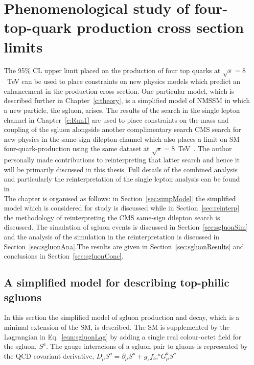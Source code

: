\chapter{Phenomenological study of \runone four-top-quark production cross section limits}
\label{c:pheno}

The 95\% CL upper limit placed on the production of four top quarks at $\sqrt{s}=8$~TeV can be used to place constraints on new physics models which predict an enhancement in the \tttt production cross section. One particular model, which is described further in Chapter~\ref{c:theory}, is a simplified model of NMSSM in which a new particle, the sgluon, arises. The results of the search in the single lepton channel in Chapter~\ref{c:Run1} are used to place constraints on the mass and coupling of the sgluon alongside another complimentary search CMS search for new physics in the same-sign dilepton channel which also places a limit on SM four-quark-production using the same dataset at $\sqrt{s}=8$~TeV~\cite{Chatrchyan:2013fea}. The author personally made contributions to reinterpreting that latter search and hence it will be primarily discussed in this thesis. Full details of the combined analysis and particularly the reinterpretation of the single lepton analysis can be found in~\cite{Beck201548}.\\
The chapter is organised as follows: in Section~\ref{sec:simpModel} the simplified model which is considered for study is discussed while in Section~\ref{sec:reinterp} the methodology of reinterpreting the CMS same-sign dilepton search is discussed. The simulation of sgluon events is discussed in Section~\ref{sec:sgluonSim} and the analysis of the simulation in the reinterpretation is discussed in Section~\ref{sec:sgluonAna}.The results are given in Section~\ref{sec:sgluonResults} and conclusions in Section~\ref{sec:sgluonConc}.

\section{A simplified model for describing top-philic sgluons \label{sec:simpModel} }
In this section the simplified model of sgluon production and decay, which is a minimal extension of the SM, is described. The SM is supplemented by the Lagrangian in Eq.~\ref{eqn:sgluonLag} by adding a single real colour-octet field for the sgluon, $S^{a}$. The gauge interacions of a sgluon pair to gluons is represented by the QCD covariant derivative, $D_{\mu}S^a= \partial_{\mu} S^a + g_s f_{bc}{}^a G_\mu^b S^c$

